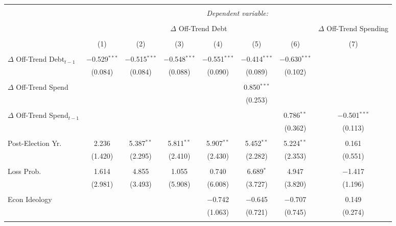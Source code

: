 
\begingroup 
\tiny 
\begin{tabular}{@{\extracolsep{5pt}}lccccccc} 
\\[-1.8ex]\hline 
\hline \\[-1.8ex] 
 & \multicolumn{7}{c}{\textit{Dependent variable:}} \\ 
\cline{2-8} 
\\[-1.8ex] & \multicolumn{6}{c}{$\Delta$ Off-Trend Debt} & $\Delta$ Off-Trend Spending \\ 
\\[-1.8ex] & (1) & (2) & (3) & (4) & (5) & (6) & (7)\\ 
\hline \\[-1.8ex] 
 $\Delta$ Off-Trend Debt$_{t-1}$ & $-$0.529$^{***}$ & $-$0.515$^{***}$ & $-$0.548$^{***}$ & $-$0.551$^{***}$ & $-$0.414$^{***}$ & $-$0.630$^{***}$ &  \\ 
  & (0.084) & (0.084) & (0.088) & (0.090) & (0.089) & (0.102) &  \\ 
  & & & & & & & \\ 
 $\Delta$ Off-Trend Spend &  &  &  &  & 0.850$^{***}$ &  &  \\ 
  &  &  &  &  & (0.253) &  &  \\ 
  & & & & & & & \\ 
 $\Delta$ Off-Trend Spend$_{t-1}$ &  &  &  &  &  & 0.786$^{**}$ & $-$0.501$^{***}$ \\ 
  &  &  &  &  &  & (0.362) & (0.113) \\ 
  & & & & & & & \\ 
 Post-Election Yr. & 2.236 & 5.387$^{**}$ & 5.811$^{**}$ & 5.907$^{**}$ & 5.452$^{**}$ & 5.224$^{**}$ & 0.161 \\ 
  & (1.420) & (2.295) & (2.410) & (2.430) & (2.282) & (2.353) & (0.551) \\ 
  & & & & & & & \\ 
 Loss Prob. & 1.614 & 4.855 & 1.055 & 0.740 & 6.689$^{*}$ & 4.947 & $-$1.417 \\ 
  & (2.981) & (3.493) & (5.908) & (6.008) & (3.727) & (3.820) & (1.196) \\ 
  & & & & & & & \\ 
 Econ Ideology &  &  &  & $-$0.742 & $-$0.645 & $-$0.707 & 0.149 \\ 
  &  &  &  & (1.063) & (0.721) & (0.745) & (0.274) \\ 
  & & & & & & & \\ 

\end{tabular}
